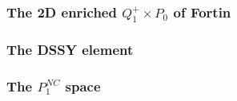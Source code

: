 

\subsubsection{The 2D enriched $Q_1^+\times P_0$ of Fortin} \label{ss:Q1pP02D}



\subsubsection{The DSSY element} \label{ss:dssy_2D}


\subsubsection{The $P_1^{NC}$ space} \label{ss:p1nc}




